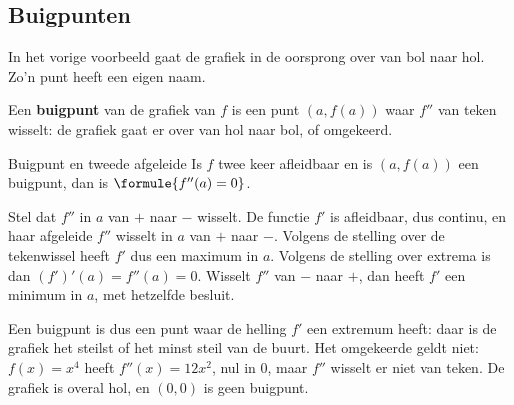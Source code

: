 \subsection{Buigpunten}

In het vorige voorbeeld gaat de grafiek in de oorsprong over van bol naar hol. Zo'n punt heeft een eigen naam.

\begin{theorie}
Een \textbf{\textcolor{accent}{buigpunt}} van de grafiek van $f$ is een punt $(a, f(a))$ waar $f''$ van teken wisselt: de grafiek gaat er over van hol naar bol, of omgekeerd.

\begin{stelling}{Buigpunt en tweede afgeleide}
Is $f$ twee keer afleidbaar en is $(a, f(a))$ een buigpunt, dan is $\formule{f''(a) = 0}$.
\end{stelling}
\begin{bewijs}
Stel dat $f''$ in $a$ van $+$ naar $-$ wisselt. De functie $f'$ is afleidbaar, dus continu, en haar afgeleide $f''$ wisselt in $a$ van $+$ naar $-$. Volgens de stelling over de tekenwissel heeft $f'$ dus een maximum in $a$. Volgens de stelling over extrema is dan $(f')'(a) = f''(a) = 0$. Wisselt $f''$ van $-$ naar $+$, dan heeft $f'$ een minimum in $a$, met hetzelfde besluit.
\end{bewijs}
\end{theorie}

Een buigpunt is dus een punt waar de helling $f'$ een extremum heeft: daar is de grafiek het steilst of het minst steil van de buurt. Het omgekeerde geldt niet: $f(x) = x^4$ heeft $f''(x) = 12x^2$, nul in $0$, maar $f''$ wisselt er niet van teken. De grafiek is overal hol, en $(0, 0)$ is geen buigpunt.

